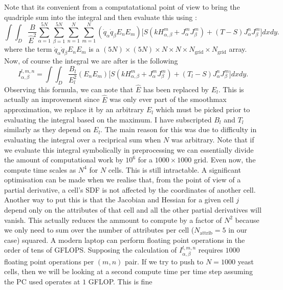 Note that its convenient from a computatational point of view to bring the quadriple sum into the integral and then evaluate this using :
\begin{equation*}
    \int \int_D \frac{B}{\hat{E}^2}  \sum_{\alpha=1}^{5N} \sum_{\beta=1}^{5N}  \sum_{n=1}^N \sum_{m=1}^N (\dot{q}_\alpha \dot{q}_\beta E_n E_m )\bigg[   S(k H_{\alpha, \beta}^m +J_\alpha^m J_\beta^m )+ (T-S)J_\alpha^n J_\beta^m\bigg] dx dy.
\end{equation*}
where the term $\dot{q}_\alpha \dot{q}_\beta E_n E_m$ is a $(5N) \times (5N) \times N \times N \times N_{\textrm{grid}} \times N_{\textrm{grid}}$ array.
Now, of course the integral we are after is the following
\begin{equation*}
    I_{\alpha, \beta}^{l,m,n} = \int \int_D \frac{B_l}{E_l^2} (E_n E_m )\bigg[   S(k H_{\alpha, \beta}^m +J_\alpha^m J_\beta^m )+ (T_l-S)J_\alpha^n J_\beta^m\bigg] dx dy.
\end{equation*}
Observing this formula, we can note that $\hat{E}$ has been replaced by $E_l$. This is actually an improvement since $\hat{E}$ was only ever part of the
smoothmax approximation, we replace it by an arbitrary $E_l$ which must be picked prior to evaluating the integral based on the maximum. I have subscripted $B_l$ and $T_l$
similarly as they depend on $E_l$. The main reason for this was due to difficulty in evaluating the integral over a reciprical sum when $N$ was arbitrary. Note that 
if we evaluate this integral symbolically in preprocessing we can essentially divide the amount of computational work by $10^6$ for a $1000 \times 1000$ grid. Even
now, the compute time scales as $N^4$ for $N$ cells. This is still intractable. A significant optimisation can be made when we realise that, from the point of view of a partial
derivative, a cell's SDF is not affected by the coordinates of another cell. Another way to put this is that the Jacobian and Hessian for a given cell $j$
depend only on the attributes of that cell and all the other partial derivatives will vanish. This actually reduces the ammount to compute by a factor of $N^2$ because
we only need to sum over the number of attributes per cell ($N_{\textrm{attrib}} = 5$ in our case) squared. A modern laptop can perform floating point
operations in the order of tens of GFLOPS. Supposing the calculation of $I_{\alpha, \beta}^{l,m,n}$ requires $1000$ floating point operations per $(m,n)$ pair. If we try
to push to $N = 1000$ yeast cells, then we will be looking at a second compute time per time step assuming the PC used operates at $1$ GFLOP. This is fine

